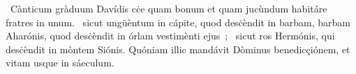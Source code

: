 {~Cànticum gràduum Davídis}
{%
cċe quam bonum et quam jucùndum habitáre fratres in unum.
~sicut ungüèntum in cápite, quod desċèndit in barbam, barbam Aharónis, quod desċèndit in órlam vestimènti ejus~;
~sicut ros Hermónis, qui desċèndit in mòntem Siónis. Quóniam illic mandávit Dòminus benedicçiónem, et vitam usque in sáeculum.
}
